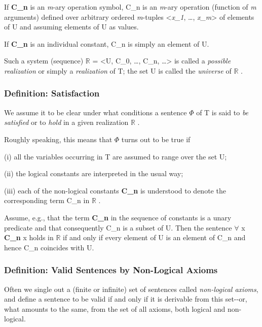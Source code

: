 If \textbf{C\_n} is an \emph{m}-ary operation symbol, C\_n is an
\emph{m}-ary operation (function of \emph{m} arguments) defined over
arbitrary ordered \emph{m}-tuples \textless{}\emph{x\_1}, \ldots,
\emph{x\_m}\textgreater{} of elements of U and assuming elements of U as
values.

If \textbf{C\_n} is an individual constant, C\_n is simply an element of
U.

Such a system (sequence) $\mathbb{R}$  = \textless U, C\_0, \ldots, C\_n,
\ldots\textgreater{} is called a \emph{possible realization} or simply a
\emph{realization} of T; the set U is called the \emph{universe} of $\mathbb{R}$ .

\hypertarget{definition-satisfaction}{%
\subsubsection{Definition: Satisfaction}\label{definition-satisfaction}}

We assume it to be clear under what conditions a sentence $\Phi$  of T is said
to \emph{be satisfied} or to \emph{hold} in a given realization $\mathbb{R}$ .

Roughly speaking, this means that $\Phi$  turns out to be true if

(i) all the variables occurring in T are assumed to range over the set
U;

(ii) the logical constants are interpreted in the usual way;

(iii) each of the non-logical constants \textbf{C\_n} is understood to
denote the corresponding term C\_n in $\mathbb{R}$ .

Assume, e.g., that the term \textbf{C\_n} in the sequence of constants
is a unary predicate and that consequently C\_n is a subset of U. Then
the sentence $\forall$ x \textbf{C\_n} x holds in $\mathbb{R}$  if and only if every element
of U is an element of C\_n and hence C\_n coincides with U.

\hypertarget{definition-valid-sentences-by-non-logical-axioms}{%
\subsubsection{Definition: Valid Sentences by Non-Logical
Axioms}\label{definition-valid-sentences-by-non-logical-axioms}}

Often we single out a (finite or infinite) set of sentences called
\emph{non-logical axioms}, and define a sentence to be valid if and only
if it is derivable from this set-\/-or, what amounts to the same, from
the set of all axioms, both logical and non-logical.

